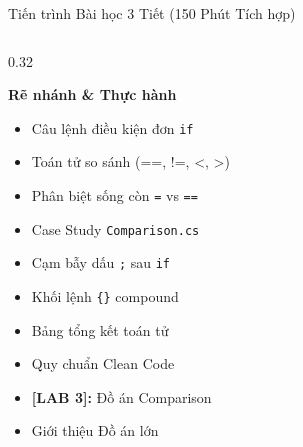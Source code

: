 \documentclass[aspectratio=169, 10pt]{beamer}
\begin{document}
\begin{frame}{Tiến trình Bài học 3 Tiết (150 Phút Tích hợp)}
\begin{columns}[T]
    \begin{column}{0.32\textwidth}
      \begin{tcolorbox}[colback=UniGreen!5,colframe=UniGreen,title=\textbf{TIẾT 3 (50')},fonttitle=\small\bfseries]
        \textbf{Rẽ nhánh \& Thực hành}
        \begin{itemize}\scriptsize
          \item Câu lệnh điều kiện đơn \texttt{if}
          \item Toán tử so sánh (==, !=, <, >)
          \item Phân biệt sống còn \texttt{=} vs \texttt{==}
          \item Case Study \texttt{Comparison.cs}
          \item Cạm bẫy dấu \texttt{;} sau \texttt{if}
          \item Khối lệnh \texttt{\{\}} compound
          \item Bảng tổng kết toán tử
          \item Quy chuẩn Clean Code
          \item \textbf{[LAB 3]:} Đồ án Comparison
          \item Giới thiệu Đồ án lớn
        \end{itemize}
      \end{tcolorbox}
    \end{column}
  \end{columns}
\end{frame}
\end{document}
